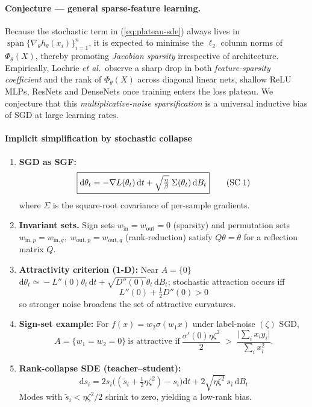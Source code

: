 \documentclass[11pt]{article}
\begin{document}
\paragraph{Conjecture — general sparse-feature learning.}
Because the stochastic term in (\ref{eq:plateau-sde}) always lives in
$\operatorname{span}\bigl\{\nabla_\theta h_\theta(x_i)\bigr\}_{i=1}^n$,
it is expected to minimise the $\ell_2$ column norms of $\Phi_\theta(X)$,
thereby promoting \emph{Jacobian sparsity} irrespective of architecture.
Empirically, Lochrie \emph{et al.}\ observe a sharp drop in both
\emph{feature-sparsity coefficient} and the rank of $\Phi_\theta(X)$ across
diagonal linear nets, shallow ReLU MLPs, ResNets and DenseNets once training
enters the loss plateau.  We conjecture that this \emph{multiplicative-noise
sparsification} is a universal inductive bias of SGD at large learning rates.

\paragraph{Implicit simplification by \textbf{stochastic collapse} \citep{chen2023stochastic}}
\vspace{-0.4em}
\begin{enumerate}\setlength\itemsep{2pt}
  \item \textbf{SGD as SGF:}
        \[
          \boxed{%
            \mathrm d\theta_t=-\nabla L(\theta_t)\,\mathrm dt
            +\sqrt{\tfrac{\eta}{\beta}}\;\Sigma(\theta_t)\,\mathrm dB_t
          } \tag{SC\;1}
        \]
        where \(\Sigma\) is the square-root covariance of per-sample gradients.
  \item \textbf{Invariant sets.}  
        Sign sets \(w_{\text{in}}=w_{\text{out}}=0\) (sparsity) and permutation sets
        \(w_{\text{in},p}=w_{\text{in},q},\;w_{\text{out},p}=w_{\text{out},q}\) (rank-reduction)
        satisfy \(Q\theta=\theta\) for a reflection matrix \(Q\).
  \item \textbf{Attractivity criterion (1-D):}
        Near \(A=\{0\}\)
        \(\mathrm d\theta_t\!\simeq\!-L''(0)\theta_t\,\mathrm dt+\sqrt{D''(0)}\theta_t\,\mathrm dB_t\);
        stochastic attraction occurs iff
        \[
          \boxed{L''(0)+\tfrac12 D''(0)>0} \tag{SC\;2}
        \]
        so stronger noise broadens the set of attractive curvatures.
  \item \textbf{Sign-set example:}
        For \(f(x)=w_2\sigma(w_1x)\) under label-noise \((\zeta)\) SGD,
        \[
          A=\{w_1=w_2=0\}\ \text{is attractive if}\ 
          \frac{\sigma'(0)\eta\zeta^2}{2}\;>\;
          \frac{\lvert\sum_i x_i y_i\rvert}{\sum_i x_i^2}. \tag{SC\;3}
        \]
  \item \textbf{Rank-collapse SDE (teacher--student):}
        \[
          \boxed{\;
          \mathrm ds_i
            =2s_i\bigl((\tilde s_i+\tfrac12\eta\zeta^{2})-s_i\bigr)\mathrm dt
            +2\sqrt{\eta\zeta^{2}}\,s_i\,\mathrm dB_t
          \;} \tag{SC\;4}
        \]
        Modes with \(\tilde s_i<\eta\zeta^{2}/2\) shrink to zero, yielding a low-rank bias.
\end{enumerate}
\end{document}
